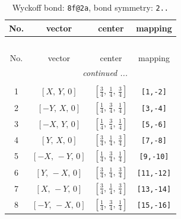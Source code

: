 \documentclass[fleqn,8pt]{jsarticle}
\begin{document}
\begin{longtable}{cccc}
\caption{Wyckoff bond: {\tt 8f@2a}, bond symmetry: {\tt 2..}}
 \\
 \hline \hline
No. & vector & center & mapping \\ \hline \endfirsthead

\multicolumn{3}{l}{\tablename\ \thetable{}} \\
 \hline \hline
No. & vector & center & mapping \\ \hline \endhead

 \hline \hline
\multicolumn{3}{r}{\footnotesize\it continued ...} \\ \endfoot

 \hline \hline
\multicolumn{3}{r}{} \\ \endlastfoot

1 & $\left[ X,\, Y,\, 0 \right]$ & $\left[ \frac{3}{4},\, \frac{1}{4},\, \frac{3}{4} \right]$ & {\tt [1,-2]} \\ \hline
2 & $\left[ - Y,\, X,\, 0 \right]$ & $\left[ \frac{1}{4},\, \frac{3}{4},\, \frac{1}{4} \right]$ & {\tt [3,-4]} \\ \hline
3 & $\left[ - X,\, Y,\, 0 \right]$ & $\left[ \frac{1}{4},\, \frac{3}{4},\, \frac{1}{4} \right]$ & {\tt [5,-6]} \\ \hline
4 & $\left[ Y,\, X,\, 0 \right]$ & $\left[ \frac{3}{4},\, \frac{1}{4},\, \frac{3}{4} \right]$ & {\tt [7,-8]} \\ \hline
5 & $\left[ - X,\, - Y,\, 0 \right]$ & $\left[ \frac{1}{4},\, \frac{3}{4},\, \frac{1}{4} \right]$ & {\tt [9,-10]} \\ \hline
6 & $\left[ Y,\, - X,\, 0 \right]$ & $\left[ \frac{3}{4},\, \frac{1}{4},\, \frac{3}{4} \right]$ & {\tt [11,-12]} \\ \hline
7 & $\left[ X,\, - Y,\, 0 \right]$ & $\left[ \frac{3}{4},\, \frac{1}{4},\, \frac{3}{4} \right]$ & {\tt [13,-14]} \\ \hline
8 & $\left[ - Y,\, - X,\, 0 \right]$ & $\left[ \frac{1}{4},\, \frac{3}{4},\, \frac{1}{4} \right]$ & {\tt [15,-16]} \\
\end{longtable}
\renewcommand{\arraystretch}{1.2}
\end{document}
